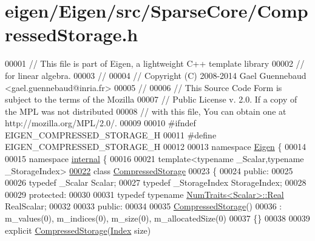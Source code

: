 \hypertarget{eigen_2_eigen_2src_2_sparse_core_2_compressed_storage_8h_source}{}\section{eigen/\+Eigen/src/\+Sparse\+Core/\+Compressed\+Storage.h}
\label{eigen_2_eigen_2src_2_sparse_core_2_compressed_storage_8h_source}

\begin{DoxyCode}
00001 \textcolor{comment}{// This file is part of Eigen, a lightweight C++ template library}
00002 \textcolor{comment}{// for linear algebra.}
00003 \textcolor{comment}{//}
00004 \textcolor{comment}{// Copyright (C) 2008-2014 Gael Guennebaud <gael.guennebaud@inria.fr>}
00005 \textcolor{comment}{//}
00006 \textcolor{comment}{// This Source Code Form is subject to the terms of the Mozilla}
00007 \textcolor{comment}{// Public License v. 2.0. If a copy of the MPL was not distributed}
00008 \textcolor{comment}{// with this file, You can obtain one at http://mozilla.org/MPL/2.0/.}
00009 
00010 \textcolor{preprocessor}{#ifndef EIGEN\_COMPRESSED\_STORAGE\_H}
00011 \textcolor{preprocessor}{#define EIGEN\_COMPRESSED\_STORAGE\_H}
00012 
00013 \textcolor{keyword}{namespace }\hyperlink{namespace_eigen}{Eigen} \{ 
00014 
00015 \textcolor{keyword}{namespace }\hyperlink{namespaceinternal}{internal} \{
00016 
00021 \textcolor{keyword}{template}<\textcolor{keyword}{typename} \_Scalar,\textcolor{keyword}{typename} \_StorageIndex>
\hyperlink{class_eigen_1_1internal_1_1_compressed_storage}{00022} \textcolor{keyword}{class }\hyperlink{class_eigen_1_1internal_1_1_compressed_storage}{CompressedStorage}
00023 \{
00024   \textcolor{keyword}{public}:
00025 
00026     \textcolor{keyword}{typedef} \_Scalar Scalar;
00027     \textcolor{keyword}{typedef} \_StorageIndex StorageIndex;
00028 
00029   \textcolor{keyword}{protected}:
00030 
00031     \textcolor{keyword}{typedef} \textcolor{keyword}{typename} \hyperlink{group___core___module_struct_eigen_1_1_num_traits}{NumTraits<Scalar>::Real} RealScalar;
00032 
00033   \textcolor{keyword}{public}:
00034 
00035     \hyperlink{class_eigen_1_1internal_1_1_compressed_storage}{CompressedStorage}()
00036       : m\_values(0), m\_indices(0), m\_size(0), m\_allocatedSize(0)
00037     \{\}
00038 
00039     \textcolor{keyword}{explicit} \hyperlink{class_eigen_1_1internal_1_1_compressed_storage}{CompressedStorage}(\hyperlink{namespace_eigen_a62e77e0933482dafde8fe197d9a2cfde}{Index} size)

\end{DoxyCode}
